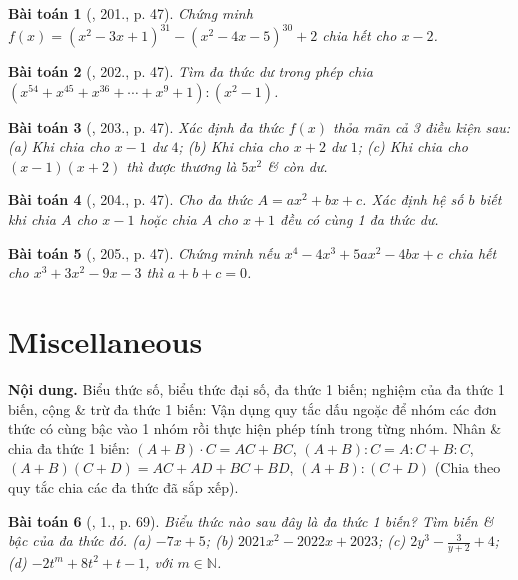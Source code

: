 \documentclass{article}
\newtheorem{baitoan}{Bài toán}
\begin{document}
\begin{baitoan}[\cite{Tuyen_Toan_7}, 201., p. 47]
	Chứng minh $f(x) = (x^2 - 3x + 1)^{31} - (x^2 - 4x - 5)^{30} + 2$ chia hết cho $x - 2$.
\end{baitoan}

\begin{baitoan}[\cite{Tuyen_Toan_7}, 202., p. 47]
	Tìm đa thức dư trong phép chia $(x^{54} + x^{45} + x^{36} + \cdots + x^9 + 1):(x^2 - 1)$.
\end{baitoan}

\begin{baitoan}[\cite{Tuyen_Toan_7}, 203., p. 47]
	Xác định đa thức $f(x)$ thỏa mãn cả 3 điều kiện sau: (a) Khi chia cho $x - 1$ dư $4$; (b) Khi chia cho $x + 2$ dư $1$; (c) Khi chia cho $(x - 1)(x + 2)$ thì được thương là $5x^2$ \& còn dư.
\end{baitoan}

\begin{baitoan}[\cite{Tuyen_Toan_7}, 204., p. 47]
	Cho đa thức $A = ax^2 + bx + c$. Xác định hệ số $b$ biết khi chia $A$ cho $x - 1$ hoặc chia $A$ cho $x + 1$ đều có cùng 1 đa thức dư.
\end{baitoan}

\begin{baitoan}[\cite{Tuyen_Toan_7}, 205., p. 47]
	Chứng minh nếu $x^4 - 4x^3 + 5ax^2 - 4bx + c$ chia hết cho $x^3 + 3x^2 - 9x - 3$ thì $a + b + c = 0$.
\end{baitoan}


\section{Miscellaneous}
\textsf{\textbf{Nội dung.} Biểu thức số, biểu thức đại số, đa thức 1 biến; nghiệm của đa thức 1 biến, cộng \& trừ đa thức 1 biến:} Vận dụng quy tắc dấu ngoặc để nhóm các đơn thức có cùng bậc vào 1 nhóm rồi thực hiện phép tính trong từng nhóm. \textsf{Nhân \& chia đa thức 1 biến:} $(A + B)\cdot C = AC + BC$, $(A + B):C = A:C + B:C$, $(A + B)(C + D) = AC + AD + BC + BD$, $(A + B):(C + D)$ (Chia theo quy tắc chia các đa thức đã sắp xếp).

\begin{baitoan}[\cite{SGK_Toan_7_Canh_Dieu_tap_2}, 1., p. 69]
	Biểu thức nào sau đây là đa thức 1 biến? Tìm biến \& bậc của đa thức đó. (a) $-7x + 5$; (b) $2021x^2 - 2022x + 2023$; (c) $2y^3 - \frac{3}{y + 2} + 4$; (d) $-2t^m + 8t^2 + t - 1$, với $m\in\mathbb{N}$.
\end{baitoan}
\end{document}
